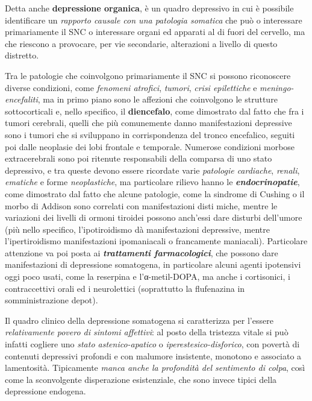 \documentclass[]{article}
\begin{document}
Detta anche \textbf{depressione organica}, è un quadro depressivo in cui
è possibile identificare un \emph{rapporto causale con una patologia
somatica} che può o interessare primariamente il SNC o interessare
organi ed apparati al di fuori del cervello, ma che riescono a
provocare, per vie secondarie, alterazioni a livello di questo
distretto.

Tra le patologie che coinvolgono primariamente il SNC si possono
riconoscere diverse condizioni, come \emph{fenomeni atrofici},
\emph{tumori}, \emph{crisi epilettiche} e \emph{meningo-encefaliti}, ma
in primo piano sono le affezioni che coinvolgono le strutture
sottocorticali e, nello specifico, il \textbf{diencefalo}, come
dimostrato dal fatto che fra i tumori cerebrali, quelli che più
comunemente danno manifestazioni depressive sono i tumori che si
sviluppano in corrispondenza del tronco encefalico, seguiti poi dalle
neoplasie dei lobi frontale e temporale. Numerose condizioni morbose
extracerebrali sono poi ritenute responsabili della comparsa di uno
stato depressivo, e tra queste devono essere ricordate varie
\emph{patologie cardiache}, \emph{renali}, \emph{ematiche} e forme
\emph{neoplastiche}, ma particolare rilievo hanno le
\textbf{\emph{endocrinopatie}}, come dimostrato dal fatto che alcune
patologie, come la sindrome di Cushing o il morbo di Addison sono
correlati con manifestazioni disti miche, mentre le variazioni dei
livelli di ormoni tiroidei possono anch'essi dare disturbi dell'umore
(più nello specifico, l'ipotiroidismo dà manifestazioni depressive,
mentre l'ipertiroidismo manifestazioni ipomaniacali o francamente
maniacali). Particolare attenzione va poi posta ai
\textbf{\emph{trattamenti farmacologici}}, che possono dare
manifestazioni di depressione somatogena, in particolare alcuni agenti
ipotensivi oggi poco usati, come la reserpina e l'α-metil-DOPA, ma anche
i cortisonici, i contraccettivi orali ed i neurolettici (soprattutto la
flufenazina in somministrazione depot).

Il quadro clinico della depressione somatogena si caratterizza per
l'essere \emph{relativamente povero di sintomi affettivi}: al posto
della tristezza vitale si può infatti cogliere uno \emph{stato
astenico-apatico} o \emph{iperestesico-disforico}, con povertà di
contenuti depressivi profondi e con malumore insistente, monotono e
associato a lamentosità. Tipicamente \emph{manca anche la profondità del
sentimento di colpa}, così come la sconvolgente disperazione
esistenziale, che sono invece tipici della depressione endogena.
\end{document}
